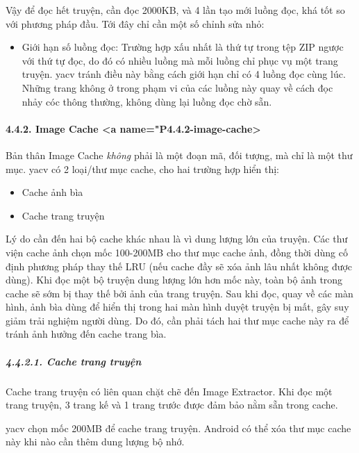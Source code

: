 \documentclass[
]{article}
\begin{document}
Vậy để đọc hết truyện, cần đọc 2000KB, và 4 lần tạo mới luồng đọc, khá
tốt so với phương pháp đầu. Tới đây chỉ cần một số chỉnh sửa nhỏ:

\begin{itemize}
\item
  Giới hạn số luồng đọc: Trường hợp xấu nhất là thứ tự trong tệp ZIP
  ngược với thứ tự đọc, do đó có nhiều luồng mà mỗi luồng chỉ phục vụ
  một trang truyện. yacv tránh điều này bằng cách giới hạn chỉ có 4
  luồng đọc cùng lúc. Những trang không ở trong phạm vi của các luồng
  này quay về cách đọc nhảy cóc thông thường, không dùng lại luồng đọc
  chờ sẵn.
\end{itemize}

\hypertarget{image-cache-a-namep4.4.2-image-cache}{%
\paragraph{4.4.2. Image Cache \textless a
name="P4.4.2-image-cache>}\label{image-cache-a-namep4.4.2-image-cache}}

Bản thân Image Cache \emph{không} phải là một đoạn mã, đối tượng, mà chỉ
là một thư mục. yacv có 2 loại/thư mục cache, cho hai trường hợp hiển
thị:

\begin{itemize}
\item
  Cache ảnh bìa
\item
  Cache trang truyện
\end{itemize}

Lý do cần đến hai bộ cache khác nhau là vì dung lượng lớn của truyện.
Các thư viện cache ảnh chọn mốc 100-200MB cho thư mục cache ảnh, đồng
thời dùng cố định phương pháp thay thế LRU (nếu cache đầy sẽ xóa ảnh lâu
nhất không được dùng). Khi đọc một bộ truyện dung lượng lớn hơn mốc này,
toàn bộ ảnh trong cache sẽ sớm bị thay thế bởi ảnh của trang truyện. Sau
khi đọc, quay về các màn hình, ảnh bìa dùng để hiển thị trong hai màn
hình duyệt truyện bị mất, gây suy giảm trải nghiệm người dùng. Do đó,
cần phải tách hai thư mục cache này ra để tránh ảnh hưởng đến cache
trang bìa.

\hypertarget{cache-trang-truyux1ec7n}{%
\subparagraph{4.4.2.1. Cache trang
truyện}\label{cache-trang-truyux1ec7n}}

Cache trang truyện có liên quan chặt chẽ đến Image Extractor. Khi đọc
một trang truyện, 3 trang kế và 1 trang trước được đảm bảo nằm sẵn trong
cache.

yacv chọn mốc 200MB để cache trang truyện. Android có thể xóa thư mục
cache này khi nào cần thêm dung lượng bộ nhớ.
\end{document}
